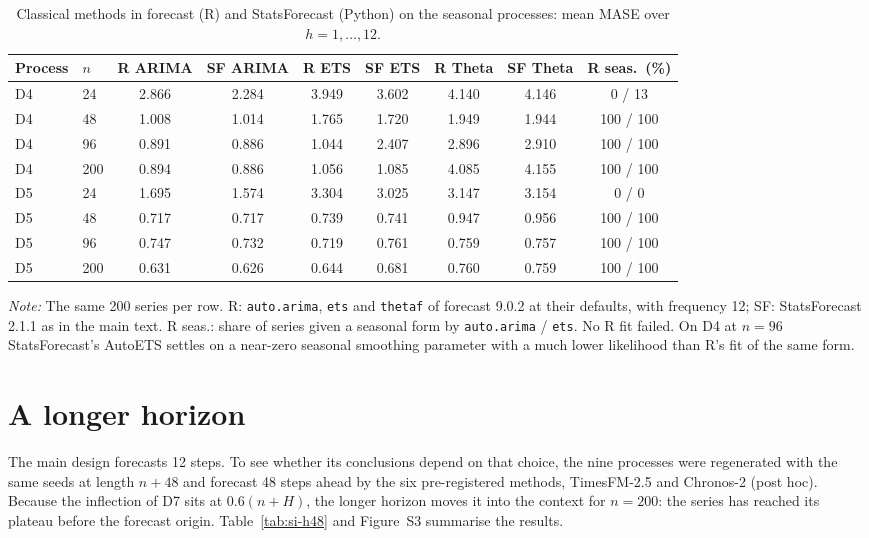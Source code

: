 \documentclass[ASNA]{USG}
\providecommand{\pkg}[1]{\textsf{#1}}
\providecommand{\code}[1]{\texttt{#1}}
\providecommand{\tableref}[1]{Table~\ref{#1}}
\begin{document}
\begin{table}[!htbp]
\centering
\begin{threeparttable}
\caption{Classical methods in \pkg{forecast} (R) and \pkg{StatsForecast} (Python) on the seasonal processes: mean MASE over $h = 1, \dots, 12$.}
\label{tab:si-rcheck}
\footnotesize\setlength{\tabcolsep}{4pt}
\begin{tabular}{llccccccc}
\toprule
Process & $n$ & R ARIMA & SF ARIMA & R ETS & SF ETS & R Theta & SF Theta & R seas.\ (\%) \\
\midrule
D4 & 24 & 2.866 & 2.284 & 3.949 & 3.602 & 4.140 & 4.146 & 0 / 13 \\
D4 & 48 & 1.008 & 1.014 & 1.765 & 1.720 & 1.949 & 1.944 & 100 / 100 \\
D4 & 96 & 0.891 & 0.886 & 1.044 & 2.407 & 2.896 & 2.910 & 100 / 100 \\
D4 & 200 & 0.894 & 0.886 & 1.056 & 1.085 & 4.085 & 4.155 & 100 / 100 \\
D5 & 24 & 1.695 & 1.574 & 3.304 & 3.025 & 3.147 & 3.154 & 0 / 0 \\
D5 & 48 & 0.717 & 0.717 & 0.739 & 0.741 & 0.947 & 0.956 & 100 / 100 \\
D5 & 96 & 0.747 & 0.732 & 0.719 & 0.761 & 0.759 & 0.757 & 100 / 100 \\
D5 & 200 & 0.631 & 0.626 & 0.644 & 0.681 & 0.760 & 0.759 & 100 / 100 \\
\bottomrule
\end{tabular}
\begin{tablenotes}[flushleft]\footnotesize
\item \textit{Note:} The same 200 series per row. R: \code{auto.arima}, \code{ets} and \code{thetaf} of \pkg{forecast} 9.0.2 at their defaults, with frequency 12; SF: \pkg{StatsForecast} 2.1.1 as in the main text. R seas.: share of series given a seasonal form by \code{auto.arima} / \code{ets}. No R fit failed. On D4 at $n = 96$ \pkg{StatsForecast}'s AutoETS settles on a near-zero seasonal smoothing parameter with a much lower likelihood than R's fit of the same form.
\end{tablenotes}
\end{threeparttable}
\end{table}


\section{A longer horizon}
\label{si:h48}

The main design forecasts 12 steps. To see whether its conclusions depend on that choice, the nine
processes were regenerated with the same seeds at length $n + 48$ and forecast 48 steps ahead by the six
pre-registered methods, TimesFM-2.5 and Chronos-2 (post hoc). Because the inflection of D7 sits at
$0.6(n + H)$, the longer horizon moves it into the context for $n = 200$: the series has reached its plateau
before the forecast origin. \tableref{tab:si-h48} and Figure~S3 summarise the results.
\end{document}
